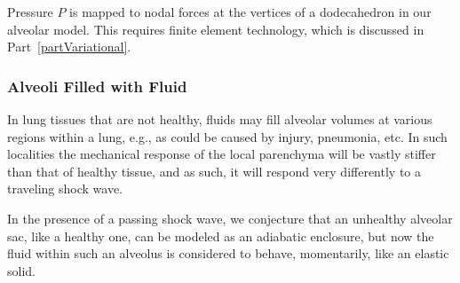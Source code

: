 Pressure $P$ is mapped to nodal forces at the vertices of a dodecahedron in our alveolar model.  This requires finite element technology, which is discussed in Part~\ref{partVariational}.

\subsubsection{Alveoli Filled with Fluid}

In lung tissues that are not healthy, fluids may fill alveolar volumes at various regions within a lung, e.g., as could be caused by injury, pneumonia, etc.  In such localities the mechanical response of the local parenchyma will be vastly stiffer than that of healthy tissue, and as such, it will respond very differently to a traveling shock wave.

In the presence of a passing shock wave, we conjecture that an unhealthy alveolar sac, like a healthy one, can be modeled as an adiabatic enclosure, but now the fluid within such an alveolus is considered to behave, momentarily, like an elastic solid.

